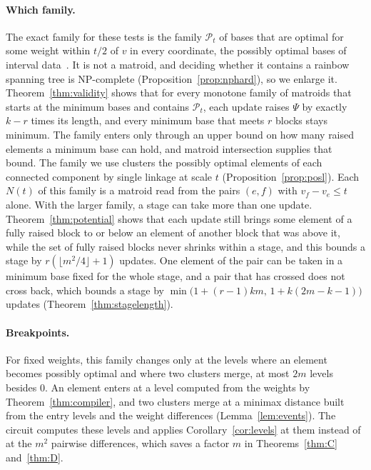 \documentclass[11pt]{article}
\newcommand{\Pos}{\mathcal P}
\begin{document}
\paragraph{Which family.}
The exact family for these tests is the family $\Pos_t$ of bases that are optimal for
some weight within $t/2$ of $v$ in every coordinate, the possibly optimal bases
of interval data~\cite{kasperski08}.  It is not a matroid, and
deciding whether it contains a rainbow spanning tree is NP-complete
(Proposition~\ref{prop:nphard}), so we enlarge it.
Theorem~\ref{thm:validity} shows that for every monotone family of matroids that
starts at the minimum bases and contains $\Pos_t$, each update raises $\Psi$ by
exactly $k-r$ times its length, and every minimum base that meets $r$ blocks
stays minimum.  The family enters only through an upper bound on how many
raised elements a minimum base can hold, and matroid intersection supplies that
bound.  The family we use clusters the possibly optimal elements of each
connected component by single linkage at scale $t$
(Proposition~\ref{prop:posl}).  Each $N(t)$ of this family is a matroid read from the pairs $(e,f)$ with
$v_f-v_e\le t$ alone.  With the larger
family, a stage can take more than one update.
Theorem~\ref{thm:potential} shows that each update still brings some element of
a fully raised block to or below an element of another block that was above it,
while the set of fully raised blocks never shrinks within a stage, and this
bounds a stage by $r(\lfloor m^{2}/4\rfloor+1)$ updates.  One element of the pair
can be taken in a minimum base fixed for the whole stage, and a pair that has
crossed does not cross back, which bounds a stage by
$\min\bigl(1+(r-1)km,\,1+k(2m-k-1)\bigr)$ updates (Theorem~\ref{thm:stagelength}).

\paragraph{Breakpoints.}
For fixed weights, this family changes only at the levels where an element becomes
possibly optimal and where two clusters merge, at most $2m$ levels besides $0$.
An element enters at a level computed from the weights by
Theorem~\ref{thm:compiler}, and two clusters merge at a minimax distance built from the entry levels and the weight differences
(Lemma~\ref{lem:events}).  The circuit computes these levels and applies
Corollary~\ref{cor:levels} at them instead of at the $m^{2}$ pairwise differences, which saves a factor $m$
in Theorems~\ref{thm:C} and~\ref{thm:D}.
\end{document}
